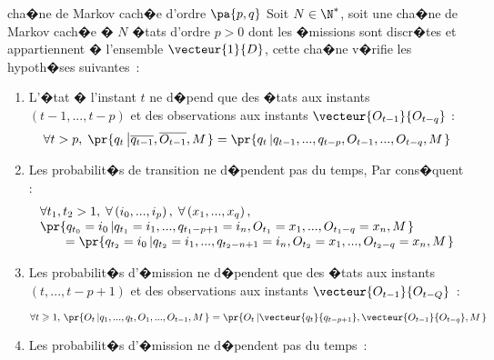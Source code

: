         \begin{xdefinition}{cha�ne de Markov cach�e d'ordre $\pa{p,q}$}%
        \label{hmm_markov_ordre_pq_def}%
        Soit $N\in\N^{\ast}$, soit une cha�ne de Markov cach�e � $N$ �tats d'ordre $p>0$ dont les �missions 
        sont discr�tes et appartiennent � l'ensemble $\vecteur{1}{D}$, cette cha�ne v�rifie les hypoth�ses suivantes~:
        
        \begin{enumerate}
        \item L'�tat � l'instant $t$ ne d�pend que des �tats aux instants $\left(  t-1,...,t-p\right)$ et 
        des observations aux instants
                $\vecteur{O_{t-1}}{O_{t-q}}$ :
                $$
                \forall t>p,\; \pr{ q_{t}\left|  \overline{q_{t-1}}, \overline{O_{t-1}},M\right. }
                =   \pr{  q_{t}\left|  q_{t-1},...,q_{t-p},O_{t-1},...,O_{t-q},M\right. }
                $$
        
        \item Les probabilit�s de transition ne d�pendent pas du temps, Par cons�quent :
                $$
                \begin{array}{l}
                \forall t_{1},t_{2}>1,\;\forall\left(i_{0},...,i_{p}\right), \; \forall\left(x_{1},...,x_{q}\right), \; \\
                \pr{   q_{t_{0}}=i_0\left|q_{t_{1}}=i_{1},...,q_{t_{1}-p+1}=i_{n}, 
                        O_{t_{1}}=x_{1},...,O_{t_{1}-q}=x_{n},M\right.  }  \\
                \quad\quad= \pr{   q_{t_{2}}=i_0\left| 
                 q_{t_{2}}=i_{1},...,q_{t_{2}-n+1}=i_{n},O_{t_{2}}=x_{1},...,O_{t_{2}-q}=x_{n},M\right.  }
                \end{array}
                $$
        
        \item Les probabilit�s d'�mission ne d�pendent que des �tats aux instants $\left(  t,...,t-p+1\right)$ 
                    et des observations aux instants $\vecteur{O_{t-1}}{O_{t-Q}}$~:
                    
                $$
                \forall t\geqslant 1,\, \pr{ O_{t}\left|q_{1},...,q_{t},O_{1},...,O_{t-1},M\right.  } =
                \pr{   O_{t}\left|  \vecteur{q_{t}}{q_{t-p+1}},\vecteur{O_{t-1}}{O_{t-q}},M\right.    }
                $$
        
        \item Les probabilit�s d'�mission ne d�pendent pas du temps~:
        

\end{enumerate}
\end{xdefinition}
